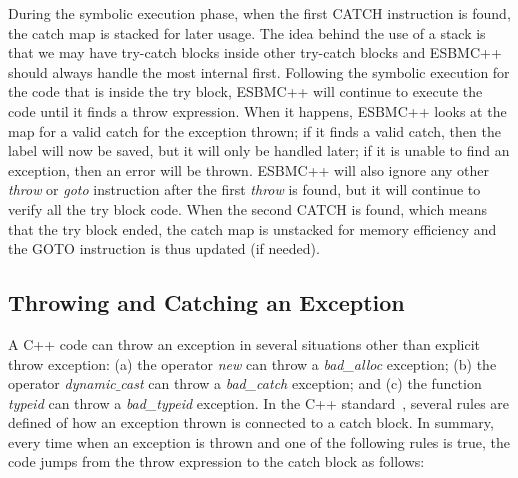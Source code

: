 \documentclass[conference]{IEEEtran}
\begin{document}
During the symbolic execution phase, when the first
CATCH instruction is found, the catch map is stacked
for later usage. The idea behind the use of a stack is
that we may have try-catch blocks inside other
try-catch blocks and ESBMC++ should always handle
the most internal first. Following the symbolic execution
for the code that is inside the try block, ESBMC++ will continue 
to execute the code until it finds a throw expression. 
When it happens, ESBMC++ looks at the map for a valid catch 
for the exception thrown; if it finds a valid catch, then the label 
will now be saved, but it will only be handled later;
if it is unable to find an exception, then an error will be thrown.
ESBMC++ will also ignore any other \textit{throw} or \textit{goto} 
instruction after the first \textit{throw} is found, but it will continue 
to verify all the try block code. When the second CATCH is found, 
which means that the try block ended, the catch map is unstacked for
 memory efficiency and the GOTO instruction is thus updated (if needed).

\subsection{Throwing and Catching an Exception}

A C++ code can throw an exception in several situations other
than explicit throw exception: (a) the operator \textit{new} can throw 
a \textit{bad\_alloc} exception; (b) the operator 
\textit{dynamic$\_$cast} can throw a \textit{bad\_catch}
exception; and (c) the function \textit{typeid} can throw a 
\textit{bad\_typeid} exception.
In the C++ standard~\cite{CppDraft}, 
several rules are defined of how an exception
thrown is connected to a catch block. 
In summary, every time when an exception is thrown and
one of the following rules is {true}, the code jumps 
from the throw expression to the catch block as follows:
\end{document}

